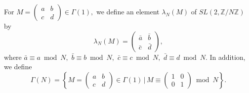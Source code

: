 \documentclass[12pt]{article}
\theoremstyle{definition}
\numberwithin{equation}{section}
\numberwithin{theorem}{section}
\begin{document}
For
$
M
=
\begin{pmatrix}
a & b \\
c & d
\end{pmatrix}
\in
\Gamma(1),
$ 
we define an element $\lambda_N(M)$ of $SL(2, \mathbb{Z}/N \mathbb{Z} )$ by 
\begin{equation*}
\lambda_N(M)
=
\begin{pmatrix}
\bar{a} & \bar{b} \\
\bar{c} & \bar{d}
\end{pmatrix},
\end{equation*}
where 
$\bar{a} \equiv a \bmod{N}, $ 
$\bar{b} \equiv b \bmod{N}, $
$\bar{c} \equiv c \bmod{N}, $
$\bar{d} \equiv d \bmod{N}. $
In addition, 
we define 
\begin{equation*}
\Gamma(N)
=
\left\{
M
=
\begin{pmatrix}
a & b \\
c & d
\end{pmatrix}
\in
\Gamma(1) \, | \,
M\equiv 
 \begin{pmatrix}
1 & 0 \\
0 & 1
\end{pmatrix} 
\bmod{N}
\right\}.
\end{equation*}
\end{document}
